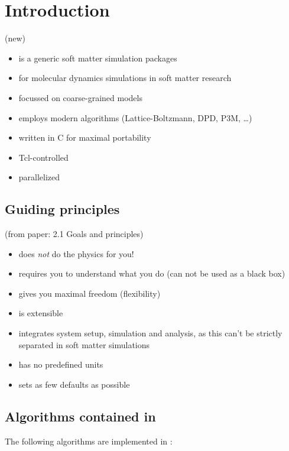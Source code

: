 \chapter{Introduction}
\label{chap:intro}

(new)

\begin{itemize}
\item \es{} is a generic soft matter simulation packages
\item for molecular dynamics simulations in soft matter research
\item focussed on coarse-grained models
\item employs modern algorithms (Lattice-Boltzmann, DPD, P3M, \ldots)
\item written in C for maximal portability
\item Tcl-controlled
\item parallelized
\end{itemize}

\section{Guiding principles}
\label{sec:ideas}

(from paper: 2.1 Goals and principles)

\es
\begin{itemize}
\item does \emph{not} do the physics for you!
\item requires you to understand what you do (can not be used as a
  black box)
\item gives you maximal freedom (flexibility)
\item is extensible
\item integrates system setup, simulation and analysis, as this can't
  be strictly separated in soft matter simulations
\item has no predefined units
\item sets as few defaults as possible
\end{itemize}

\section{Algorithms contained in \es}

The following algorithms are implemented in \es{}:


